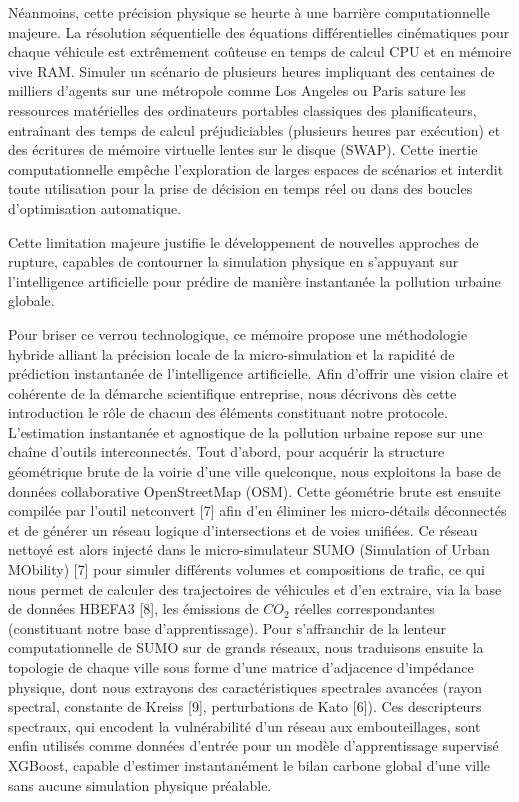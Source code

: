 \documentclass[10pt, a4paper]{article}
\begin{document}
Néanmoins, cette précision physique se heurte à une barrière
computationnelle majeure. La résolution séquentielle des équations
différentielles cinématiques pour chaque véhicule est extrêmement
coûteuse en temps de calcul CPU et en mémoire vive RAM. Simuler un
scénario de plusieurs heures impliquant des centaines de milliers
d'agents sur une métropole comme Los Angeles ou Paris sature les
ressources matérielles des ordinateurs portables classiques des
planificateurs, entraînant des temps de calcul préjudiciables (plusieurs
heures par exécution) et des écritures de mémoire virtuelle lentes sur
le disque (SWAP). Cette inertie computationnelle empêche l'exploration
de larges espaces de scénarios et interdit toute utilisation pour la
prise de décision en temps réel ou dans des boucles d'optimisation
automatique.

Cette limitation majeure justifie le développement de nouvelles
approches de rupture, capables de contourner la simulation physique en
s'appuyant sur l'intelligence artificielle pour prédire de manière
instantanée la pollution urbaine globale.

Pour briser ce verrou technologique, ce mémoire propose une méthodologie
hybride alliant la précision locale de la micro-simulation et la
rapidité de prédiction instantanée de l'intelligence artificielle. Afin
d'offrir une vision claire et cohérente de la démarche scientifique
entreprise, nous décrivons dès cette introduction le rôle de chacun des
éléments constituant notre protocole. L'estimation instantanée et
agnostique de la pollution urbaine repose sur une chaîne d'outils
interconnectés. Tout d'abord, pour acquérir la structure géométrique
brute de la voirie d'une ville quelconque, nous exploitons la base de
données collaborative OpenStreetMap (OSM). Cette géométrie brute est
ensuite compilée par l'outil netconvert {[}7{]} afin d'en éliminer les
micro-détails déconnectés et de générer un réseau logique
d'intersections et de voies unifiées. Ce réseau nettoyé est alors
injecté dans le micro-simulateur SUMO (Simulation of Urban MObility)
{[}7{]} pour simuler différents volumes et compositions de trafic, ce
qui nous permet de calculer des trajectoires de véhicules et d'en
extraire, via la base de données HBEFA3 {[}8{]}, les émissions de
\(CO_2\) réelles correspondantes (constituant notre base
d'apprentissage). Pour s'affranchir de la lenteur computationnelle de
SUMO sur de grands réseaux, nous traduisons ensuite la topologie de
chaque ville sous forme d'une matrice d'adjacence d'impédance physique,
dont nous extrayons des caractéristiques spectrales avancées (rayon
spectral, constante de Kreiss {[}9{]}, perturbations de Kato {[}6{]}).
Ces descripteurs spectraux, qui encodent la vulnérabilité d'un réseau
aux embouteillages, sont enfin utilisés comme données d'entrée pour un
modèle d'apprentissage supervisé XGBoost, capable d'estimer
instantanément le bilan carbone global d'une ville sans aucune
simulation physique préalable.
\end{document}
